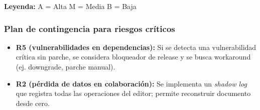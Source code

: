 \documentclass[12pt]{article}
\begin{document}
\textbf{Leyenda:} \colorbox{high}{A = Alta} \quad \colorbox{medium}{M = Media} \quad \colorbox{low}{B = Baja}

\subsubsection{Plan de contingencia para riesgos críticos}

\begin{itemize}
    \item \textbf{R5 (vulnerabilidades en dependencias):} Si se detecta una vulnerabilidad crítica sin parche, se considera bloqueador de release y se busca workaround (ej. downgrade, parche manual).
    
    \item \textbf{R2 (pérdida de datos en colaboración):} Se implementa un \textit{shadow log} que registra todas las operaciones del editor; permite reconstruir documento desde cero.
\end{itemize}

\end{document}
